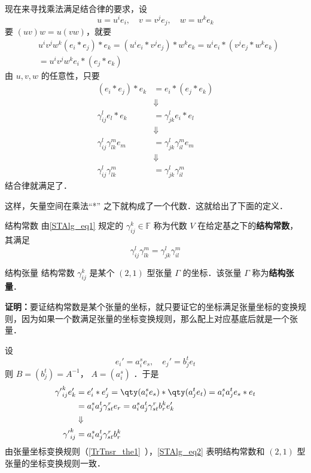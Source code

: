 现在来寻找乘法满足结合律的要求，设
\begin{equation}
u=u^ie_i,\quad v=v^je_j,\quad w=w^ke_k
\end{equation}
要 $(uv)w=u(vw)$，就要
\begin{equation}
\begin{aligned}
&u^iv^jw^k (e_i*e_j)*e_k=(u^ie_i *v^je_j)*w^ke_k=u^ie_i *(v^je_j*w^ke_k)\\
&=u^iv^jw^k e_i*(e_j*e_k)
\end{aligned}
\end{equation}
由 $u,v,w$ 的任意性，只要
\begin{equation}
\begin{aligned}
(e_i*e_j)*e_k&=e_i*(e_j*e_k)\\
&\Downarrow\\
\gamma_{ij}^le_l*e_k&=\gamma_{jk}^le_i*e_l\\
&\Downarrow\\
\gamma_{ij}^l\gamma_{lk}^{m}e_m&=\gamma_{jk}^l\gamma_{il}^m e_m\\
&\Downarrow\\
\gamma_{ij}^l\gamma_{lk}^{m}&=\gamma_{jk}^l\gamma_{il}^m
\end{aligned}
\end{equation}
结合律就满足了．

这样，矢量空间在乘法“*” 之下就构成了一个代数．这就给出了下面的定义．
\begin{definition}{结构常数}
由\autoref{STAlg_eq1} 规定的 $\gamma_{ij}^k\in\mathbb F$ 称为代数 $V$ 在给定基之下的\textbf{结构常数}，其满足
\begin{equation}
\gamma_{ij}^l\gamma_{lk}^{m}=\gamma_{jk}^l\gamma_{il}^m
\end{equation}
\end{definition}
\begin{theorem}{结构张量}
结构常数 $\gamma_{ij}^k$ 是某个 $(2,1)$ 型张量 $\Gamma$ 的坐标．该张量 $\Gamma$ 称为\textbf{结构张量}．
\end{theorem}
\textbf{证明：}要证结构常数是某个张量的坐标，就只要证它的坐标满足张量坐标的变换规则，因为如果一个数满足张量的坐标变换规则，那么配上对应基底后就是一个张量．

设
\begin{equation}
e_i'=a_i^s e_s,\quad e_j'=b_j^t e_t
\end{equation}
则 $B=(b_j^t)=A^{-1}$， $A=(a_i^s)$ ．于是
\begin{equation}\label{STAlg_eq2}
\begin{aligned}
{\gamma'}_{ij}^ke'_k&=e'_i*e'_j=\qty(a_i^s e_s)*\qty(a_j^t e_t)=a_i^s a_j^te_s*e_t\\
&=a_i^sa_j^t\gamma_{st}^r e_r=a_i^sa_j^t\gamma_{st}^r b_r^k e'_k\\
&\Downarrow\\
{\gamma'}_{ij}^k&=a_i^sa_j^t\gamma_{st}^r b_r^k
\end{aligned}
\end{equation}
由张量坐标变换规则（\autoref{TrTnsr_the1}~），\autoref{STAlg_eq2} 表明结构常数和 $(2,1)$ 型张量的坐标变换规则一致．

